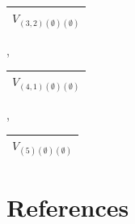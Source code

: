 \documentclass[letterpaper,11pt]{article}
\begin{document}
	\begin{tabular}{| c |}
		\hline
		$V_{(3,2)(\emptyset)(\emptyset)}$\\
		\hline
	\end{tabular}, 
	\begin{tabular}{| c |}
		\hline
		$V_{(4,1)(\emptyset)(\emptyset)}$\\
		\hline
	\end{tabular}, 
	\begin{tabular}{| c |}
		\hline
		$V_{(5)(\emptyset)(\emptyset)}$\\
		\hline
	\end{tabular}
	
	
	\section{References}
	{\footnotesize
		
		}

	\newpage
\end{document}
